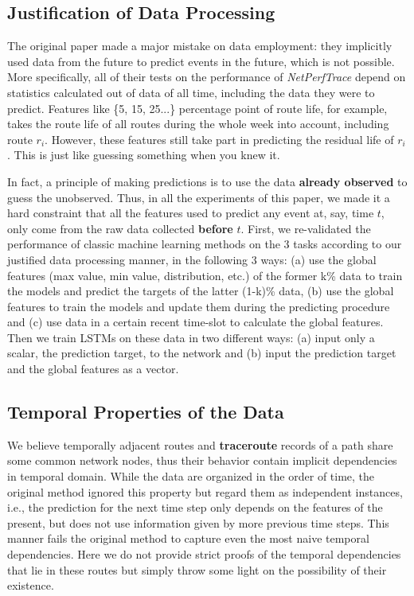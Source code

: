\documentclass[sigconf]{acmart}
\begin{document}
\subsection{Justification of Data Processing}
The original paper \cite{predict} made a major mistake on data employment: they implicitly used data from the future to predict events in the future, which is not possible. More specifically, all of their tests on the performance of \textit{NetPerfTrace} depend on statistics calculated out of data of all time, including the data they were to predict. Features like \{5, 15, 25...\} percentage point of route life, for example, takes the route life of all routes during the whole week into account, including route $r_i$. However, these features still take part in predicting the residual life of $r_i$. This is just like guessing something when you knew it.

In fact, a principle of making predictions is to use the data \textbf{already observed} to guess the unobserved. Thus, in all the experiments of this paper, we made it a hard constraint that all the features used to predict any event at, say, time $t$, only come from the raw data collected \textbf{before} $t$. First, we re-validated the performance of classic machine learning methods on the 3 tasks according to our justified data processing manner, in the following 3 ways: (a) use the global features (max value, min value, distribution, etc.) of the former k\% data to train the models and predict the targets of the latter (1-k)\% data, (b) use the global features to train the models and update them during the predicting procedure and (c) use data in a certain recent time-slot to calculate the global features. Then we train LSTMs on these data in two different ways: (a) input only a scalar, the prediction target, to the network and (b) input the prediction target and the global features as a vector.

\subsection{Temporal Properties of the Data}
We believe temporally adjacent routes and \textbf{traceroute} records of a path share some common network nodes, thus their behavior contain implicit dependencies in temporal domain. While the data are organized in the order of time, the original method ignored this property but regard them as independent instances, i.e., the prediction for the next time step only depends on the features of the present, but does not use information given by more previous time steps. This manner fails the original method to capture even the most naive temporal dependencies. Here we do not provide strict proofs of the temporal dependencies that lie in these routes but simply throw some light on the possibility of their existence.
\end{document}
